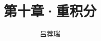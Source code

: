 \documentclass[14pt,notheorems,leqno,xcolor={rgb}]{beamer} %
\begin{document}

\title{第十章·重积分}
\author{\href{https://lvjr.bitbucket.io}{吕荐瑞}}

\begin{frame}[plain]
\titlepage
\end{frame}



\ifligong

\fi
\makeatletter
{}\relax
\setcounter{section}{3}
\makeatother

\end{document}
